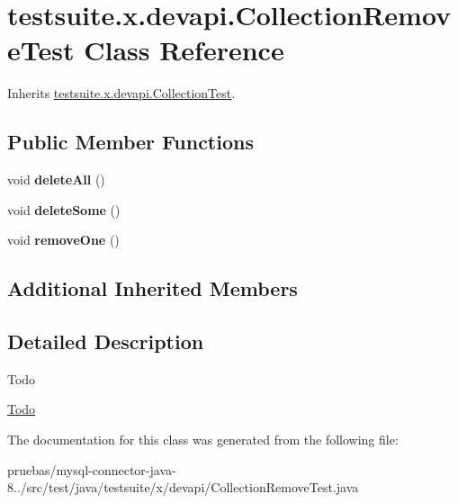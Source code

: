 \hypertarget{classtestsuite_1_1x_1_1devapi_1_1_collection_remove_test}{}\section{testsuite.\+x.\+devapi.\+Collection\+Remove\+Test Class Reference}
\label{classtestsuite_1_1x_1_1devapi_1_1_collection_remove_test}


Inherits \mbox{\hyperlink{classtestsuite_1_1x_1_1devapi_1_1_collection_test}{testsuite.\+x.\+devapi.\+Collection\+Test}}.

\subsection*{Public Member Functions}
\begin{DoxyCompactItemize}
\item 
\mbox{\label{classtestsuite_1_1x_1_1devapi_1_1_collection_remove_test_aa19755b80ccaa64b8e837e62c9cf4771}} 
void {\bfseries delete\+All} ()
\item 
\mbox{\label{classtestsuite_1_1x_1_1devapi_1_1_collection_remove_test_a8fe87fd6558d6d9a1b380f1681357bcc}} 
void {\bfseries delete\+Some} ()
\item 
\mbox{\label{classtestsuite_1_1x_1_1devapi_1_1_collection_remove_test_abeedf7f001dc70e388e11e9bf7624331}} 
void {\bfseries remove\+One} ()
\end{DoxyCompactItemize}
\subsection*{Additional Inherited Members}


\subsection{Detailed Description}
\begin{DoxyRefDesc}{Todo}
\item[\mbox{\hyperlink{todo__todo000007}{Todo}}]\end{DoxyRefDesc}


The documentation for this class was generated from the following file\+:\begin{DoxyCompactItemize}
\item 
pruebas/mysql-\/connector-\/java-\/8../src/test/java/testsuite/x/devapi/Collection\+Remove\+Test.\+java\end{DoxyCompactItemize}
